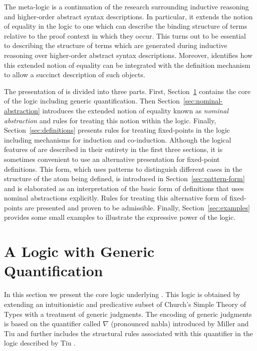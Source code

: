 The meta-logic \logic is a continuation of the research surrounding
inductive reasoning and higher-order abstract syntax descriptions. In
particular, it extends the notion of equality in the logic to one
which can describe the binding structure of terms relative to the
proof context in which they occur. This turns out to be essential to
describing the structure of terms which are generated during inductive
reasoning over higher-order abstract syntax descriptions. Moreover,
\logic identifies how this extended notion of equality can be
integrated with the definition mechanism to allow a succinct
description of such objects.

The presentation of \logic is divided into three parts. First,
Section~\ref{sec:logic} contains the core of the logic including
generic quantification. Then Section~\ref{sec:nominal-abstraction}
introduces the extended notion of equality known as {\em nominal
  abstraction} and rules for treating this notion within the logic.
Finally, Section~\ref{sec:definitions} presents rules for treating
fixed-points in the logic including mechanisms for induction and
co-induction. Although the logical features of \logic are described in
their entirety in the first three sections, it is sometimes convenient
to use an alternative presentation for fixed-point definitions. This
form, which uses patterns to distinguish different cases in the
structure of the atom being defined, is introduced in
Section~\ref{sec:pattern-form} and is elaborated as an interpretation
of the basic form of definitions that uses nominal abstractions
explicitly. Rules for treating this alternative form of fixed-points
are presented and proven to be admissible. Finally,
Section~\ref{sec:examples} provides some small examples to illustrate
the expressive power of the logic.

\section{A Logic with Generic Quantification}
\label{sec:logic}

In this section we present the core logic underlying \logic. This
logic is obtained by extending an intuitionistic and predicative
subset of Church's Simple Theory of Types with a treatment of generic
judgments. The encoding of generic judgments is based on the
quantifier called $\nabla$ (pronounced nabla) introduced by Miller and
Tiu \cite{miller05tocl} and further includes the structural rules
associated with this quantifier in the logic \LG described by Tiu
\cite{tiu06lfmtp}.


